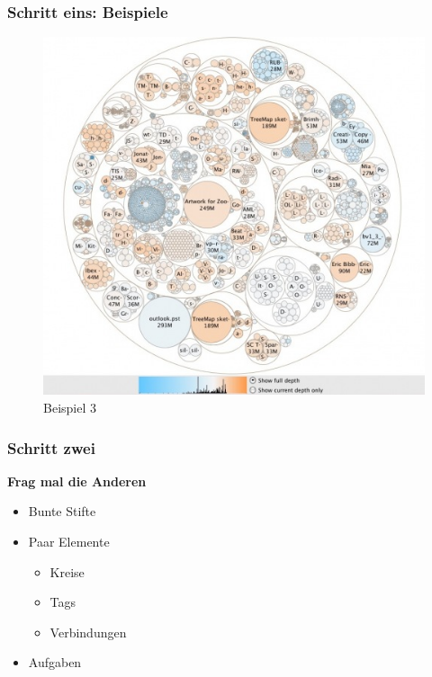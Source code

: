 \begin{frame}

\frametitle{Schritt eins: Beispiele}
\label{schritteins:beispiele}

\begin{figure}[htbp]
\centering
\includegraphics[keepaspectratio,width=\textwidth,height=0.75\textheight]{s1_bsp3.jpg}
\caption{Beispiel 3}
\label{}
\end{figure}


\end{frame}

\begin{frame}

\frametitle{Schritt zwei}
\label{schrittzwei}

\textbf{Frag mal die Anderen}

\begin{itemize}
\item Bunte Stifte

\item Paar Elemente

\begin{itemize}
\item Kreise

\item Tags

\item Verbindungen

\end{itemize}

\item Aufgaben

\end{itemize}

\end{frame}


